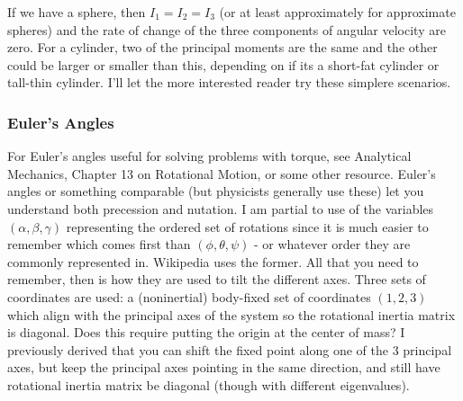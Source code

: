 \documentclass[10pt]{article}
\begin{document}
If we have a sphere, then $I_1=I_2=I_3$ (or at least approximately for 
approximate spheres) and the rate of change of the three components of 
angular velocity are zero. 
For a cylinder, two of the principal moments are the same and the other 
could be larger or smaller than this, depending on if its a short-fat 
cylinder or tall-thin cylinder. I'll let the more interested reader 
try these simplere scenarios.

\subsubsection{Euler's Angles}

For Euler's angles useful for solving problems with torque, see 
Analytical Mechanics, Chapter 13 on Rotational Motion, or some other 
resource. Euler's angles or something comparable (but 
physicists generally use these) let you understand both precession and 
nutation. I am partial to use of the variables $(\alpha,\beta,\gamma)$ 
representing the ordered set of rotations since it is much easier to 
remember which comes first than $(\phi,\theta,\psi)$ - or whatever order 
they are commonly represented in. Wikipedia uses the former. All that 
you need to remember, then is how they are used to tilt the 
different axes. Three sets of coordinates are used: a (noninertial) body-fixed 
set of coordinates $(1,2,3)$ which align with the principal axes of the
system so the rotational inertia matrix is diagonal. 
Does this require putting the origin at the center of mass? I previously 
derived that you can shift the fixed point along one of the 3 principal axes, 
but keep the principal axes pointing in the same direction, and still have 
rotational inertia matrix be diagonal (though with different eigenvalues).
\end{document}
